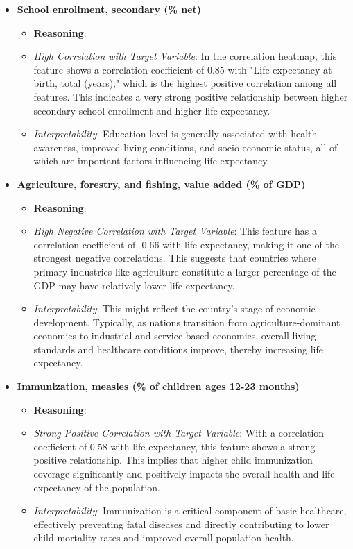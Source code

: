 \documentclass{article}
\begin{document}
\begin{itemize}
    \item \textbf{School enrollment, secondary (\% net)}
    \begin{itemize}
        \item \textbf{Reasoning}:
        \item \textit{High Correlation with Target Variable}: In the correlation heatmap, this feature shows a correlation coefficient of 0.85 with "Life expectancy at birth, total (years)," which is the highest positive correlation among all features. This indicates a very strong positive relationship between higher secondary school enrollment and higher life expectancy.
        \item \textit{Interpretability}: Education level is generally associated with health awareness, improved living conditions, and socio-economic status, all of which are important factors influencing life expectancy.
    \end{itemize}

    \item \textbf{Agriculture, forestry, and fishing, value added (\% of GDP)}
    \begin{itemize}
        \item \textbf{Reasoning}:
        \item \textit{High Negative Correlation with Target Variable}: This feature has a correlation coefficient of -0.66 with life expectancy, making it one of the strongest negative correlations. This suggests that countries where primary industries like agriculture constitute a larger percentage of the GDP may have relatively lower life expectancy.
        \item \textit{Interpretability}: This might reflect the country's stage of economic development. Typically, as nations transition from agriculture-dominant economies to industrial and service-based economies, overall living standards and healthcare conditions improve, thereby increasing life expectancy.
    \end{itemize}

    \item \textbf{Immunization, measles (\% of children ages 12-23 months)}
    \begin{itemize}
        \item \textbf{Reasoning}:
        \item \textit{Strong Positive Correlation with Target Variable}: With a correlation coefficient of 0.58 with life expectancy, this feature shows a strong positive relationship. This implies that higher child immunization coverage significantly and positively impacts the overall health and life expectancy of the population.
        \item \textit{Interpretability}: Immunization is a critical component of basic healthcare, effectively preventing fatal diseases and directly contributing to lower child mortality rates and improved overall population health.
    \end{itemize}


\end{itemize}
\end{document}
